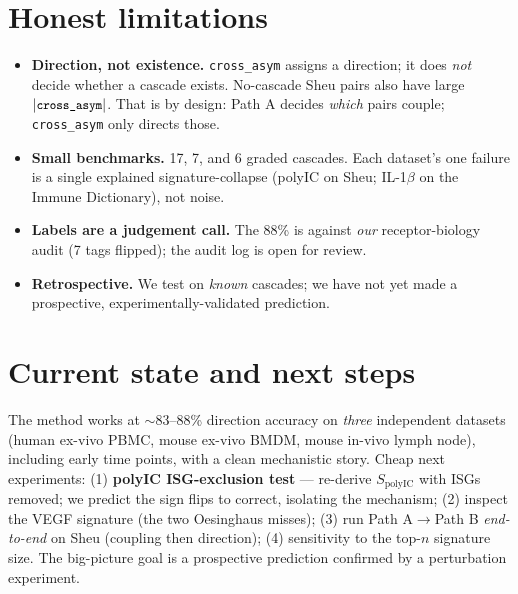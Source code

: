 \documentclass[11pt]{article}
\newcommand{\code}[1]{\texttt{\small #1}}
\newcommand{\cross}{\code{cross\_asym}}
\begin{document}
\section{Honest limitations}\label{sec:limits}
\begin{itemize}[leftmargin=1.3em,itemsep=2pt]
\item \textbf{Direction, not existence.} \cross{} assigns a direction; it does
\emph{not} decide whether a cascade exists. No-cascade Sheu pairs also have large
$|\cross|$. That is by design: Path A decides \emph{which} pairs couple; \cross{}
only directs those.
\item \textbf{Small benchmarks.} 17, 7, and 6 graded cascades. Each dataset's one
failure is a single explained signature-collapse (polyIC on Sheu; IL-1$\beta$ on
the Immune Dictionary), not noise.
\item \textbf{Labels are a judgement call.} The 88\% is against \emph{our}
receptor-biology audit (7 tags flipped); the audit log is open for review.
\item \textbf{Retrospective.} We test on \emph{known} cascades; we have not yet
made a prospective, experimentally-validated prediction.
\end{itemize}

\section{Current state and next steps}\label{sec:next}
The method works at $\sim$83--88\% direction accuracy on \emph{three} independent
datasets (human ex-vivo PBMC, mouse ex-vivo BMDM, mouse in-vivo lymph node),
including early time points, with a clean mechanistic story. Cheap next
experiments: (1) \textbf{polyIC ISG-exclusion test} --- re-derive
$S_{\text{polyIC}}$ with ISGs removed; we predict the sign flips to correct,
isolating the mechanism; (2) inspect the VEGF signature (the two Oesinghaus
misses); (3) run Path A$\to$Path B \emph{end-to-end} on Sheu (coupling then
direction); (4) sensitivity to the top-$n$ signature size. The big-picture goal is
a prospective prediction confirmed by a perturbation experiment.

\end{document}
